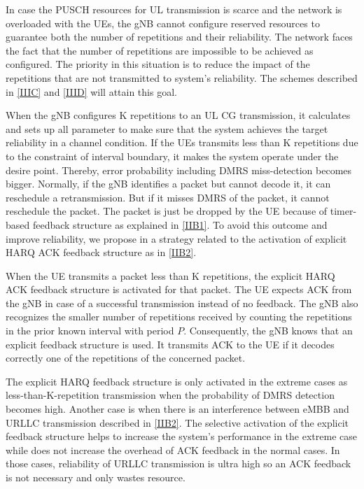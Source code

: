 \documentclass{ieeeaccess}
\begin{document}
In case the PUSCH resources for UL transmission is scarce and the network is overloaded with the UEs, the gNB cannot configure reserved resources to guarantee both the number of repetitions and their reliability. The network faces the fact that the number of repetitions are impossible to be achieved as configured. The priority in this situation is to reduce the impact of the repetitions that are not transmitted to system's reliability. The schemes described in \ref{IIIC} and \ref{IIID} will attain this goal.

When the gNB configures K repetitions to an UL CG transmission, it calculates and sets up all parameter to make sure that the system achieves the target reliability in a channel condition. If the UEs transmits less than K repetitions due to the constraint of interval boundary, it makes the system operate under the desire point. Thereby, error probability including DMRS miss-detection becomes bigger. Normally, if the gNB identifies a packet but cannot decode it, it can reschedule a retransmission. But if it misses DMRS of the packet, it cannot reschedule the packet. The packet is just be dropped by the UE because of timer-based feedback structure as explained in \ref{IIB1}. To avoid this outcome and improve reliability,  we propose in \cite{ad100} a strategy related to the activation of explicit HARQ ACK feedback structure as in \ref{IIB2}.

When the UE transmits a packet less than K repetitions, the explicit HARQ ACK feedback structure is activated for that packet. The UE expects ACK from the gNB in case of a successful transmission instead of no feedback. The gNB also recognizes the smaller number of repetitions received by counting the repetitions in the prior known interval with period $P$. Consequently, the gNB knows that an explicit feedback structure is used. It transmits ACK to the UE if it decodes correctly one of the repetitions of the concerned packet.

The explicit HARQ feedback structure is only activated in the extreme cases as less-than-K-repetition transmission when the probability of DMRS detection becomes high. Another case is when there is an interference between eMBB and URLLC transmission described in \ref{IIB2}. The selective activation of the explicit feedback structure helps to increase the system's performance in the extreme case while does not increase the overhead of ACK feedback in the normal cases. In those cases, reliability of URLLC transmission is ultra high so an ACK feedback is not necessary and only wastes resource.
\end{document}
